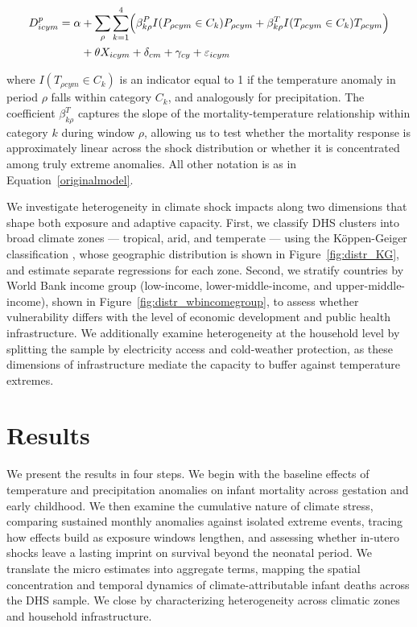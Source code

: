 \documentclass[a4paper]{article}
\begin{document}
\begin{equation}
\begin{split}
D_{icym}^p = \alpha &+ \sum_{\rho} \sum_{k=1}^{4} \Bigl( \beta^{P}_{k\rho} I(P_{\rho cym} \in C_k) P_{\rho cym} + \beta^{T}_{k\rho} I(T_{\rho cym} \in C_k) T_{\rho cym} \Bigr) \\
&+ \theta X_{icym} + \delta_{cm} + \gamma_{cy} + \varepsilon_{icym}
\end{split}
\label{splinemodel}
\end{equation}

where $I(T_{\rho cym} \in C_k)$ is an indicator equal to 1 if the temperature anomaly in period $\rho$ falls within category $C_k$, and analogously for precipitation. The coefficient $\beta^{T}_{k\rho}$ captures the slope of the mortality-temperature relationship within category $k$ during window $\rho$, allowing us to test whether the mortality response is approximately linear across the shock distribution or whether it is concentrated among truly extreme anomalies. All other notation is as in Equation~\ref{originalmodel}.

We investigate heterogeneity in climate shock impacts along two dimensions that shape both exposure and adaptive capacity. First, we classify DHS clusters into broad climate zones — tropical, arid, and temperate — using the Köppen-Geiger classification \parencite{kottek2006,rubel2010}, whose geographic distribution is shown in Figure~\ref{fig:distr_KG}, and estimate separate regressions for each zone. Second, we stratify countries by World Bank income group (low-income, lower-middle-income, and upper-middle-income), shown in Figure~\ref{fig:distr_wbincomegroup}, to assess whether vulnerability differs with the level of economic development and public health infrastructure. We additionally examine heterogeneity at the household level by splitting the sample by electricity access and cold-weather protection, as these dimensions of infrastructure mediate the capacity to buffer against temperature extremes.

\section{Results} \label{sec:results}

We present the results in four steps. We begin with the baseline effects of temperature and precipitation anomalies on infant mortality across gestation and early childhood. We then examine the cumulative nature of climate stress, comparing sustained monthly anomalies against isolated extreme events, tracing how effects build as exposure windows lengthen, and assessing whether in-utero shocks leave a lasting imprint on survival beyond the neonatal period. We translate the micro estimates into aggregate terms, mapping the spatial concentration and temporal dynamics of climate-attributable infant deaths across the DHS sample. We close by characterizing heterogeneity across climatic zones and household infrastructure.
\end{document}
